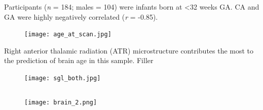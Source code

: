 \documentclass[final]{beamer}
\newlength{\colwidth}
\begin{document}
\begin{frame}[t]
\begin{columns}[t]
\begin{column}{\colwidth}
  \vspace{-15pt}
  \begin{block}{Participants (\textit{n} = 184; males = 104) were infants born at \textless 32 weeks GA. CA and GA were highly negatively correlated (\textit{r} = -0.85).}
    \vspace{-5pt}
    \begin{figure}[ht]
      \centering
      \texttt{[image: age\_at\_scan.jpg]}
      \label{fig:age_at_scan}
    \end{figure}
  \end{block}
  \vspace{-20pt}
  
  \begin{block}{Right anterior thalamic radiation (ATR) microstructure contributes the most to the prediction of brain age in this sample.}
    Filler

    \vspace{-10pt}
    
    \begin{figure}
      \centering
      \texttt{[image: sgl\_both.jpg]}
    \end{figure}
    \vspace{-20pt}  %

    
    \begin{columns}[t] %
        \begin{column}{0.53\textwidth}
            \vspace{-10pt}
            \begin{figure} %
            \centering  \texttt{[image: brain\_2.png]}
            \end{figure}
      \end{column}
    

\end{columns}
\end{block}
\end{column}
\end{columns}
\end{frame}
\end{document}
